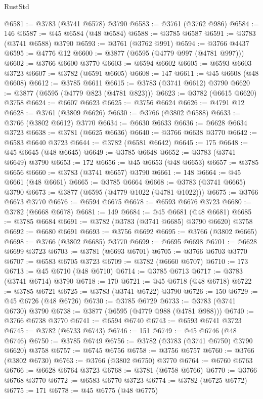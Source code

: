 \begin{lexlean}{RustStd}
\begin{coremodule}
@6581 := @3783 (@3741 @6578) @3790
@6583 := @3761 (@3762 @986)
@6584 := 146
@6587 := @45 @6584 (@48 @6584)
@6588 := @3785 @6587
@6591 := @3783 (@3741 @6588) @3790
@6593 := @3761 (@3762 @991)
@6594 := @3766 @4437
@6595 := @4776 @12
@6600 := @3877 (@6595 (@4779 @997 (@4781 @997)))
@6602 := @3766 @6600 @3770
@6603 := @6594 @6602
@6605 := @6593 @6603 @3723
@6607 := @3782 (@6591 @6605)
@6608 := 147
@6611 := @45 @6608 (@48 @6608)
@6612 := @3785 @6611
@6615 := @3783 (@3741 @6612) @3790
@6620 := @3877 (@6595 (@4779 @823 (@4781 @823)))
@6623 := @3782 (@6615 @6620) @3758
@6624 := @6607 @6623
@6625 := @3756 @6624
@6626 := @4791 @12
@6628 := @3761 (@3809 @6626)
@6630 := @3766 (@3802 @6588)
@6633 := @3766 (@3802 @6612) @3770
@6634 := @6630 @6633
@6636 := @6628 @6634 @3723
@6638 := @3781 (@6625 @6636)
@6640 := @3766 @6638 @3770
@6642 := @6583 @6640 @3723
@6644 := @3782 (@6581 @6642)
@6645 := 175
@6648 := @45 @6645 (@48 @6645)
@6649 := @3785 @6648
@6652 := @3783 (@3741 @6649) @3790
@6653 := 172
@6656 := @45 @6653 (@48 @6653)
@6657 := @3785 @6656
@6660 := @3783 (@3741 @6657) @3790
@6661 := 148
@6664 := @45 @6661 (@48 @6661)
@6665 := @3785 @6664
@6668 := @3783 (@3741 @6665) @3790
@6673 := @3877 (@6595 (@4779 @1022 (@4781 @1022)))
@6675 := @3766 @6673 @3770
@6676 := @6594 @6675
@6678 := @6593 @6676 @3723
@6680 := @3782 (@6668 @6678)
@6681 := 149
@6684 := @45 @6681 (@48 @6681)
@6685 := @3785 @6684
@6691 := @3782 (@3783 (@3741 @6685) @3790 @6620) @3758
@6692 := @6680 @6691
@6693 := @3756 @6692
@6695 := @3766 (@3802 @6665)
@6698 := @3766 (@3802 @6685) @3770
@6699 := @6695 @6698
@6701 := @6628 @6699 @3723
@6703 := @3781 (@6693 @6701)
@6705 := @3766 @6703 @3770
@6707 := @6583 @6705 @3723
@6709 := @3782 (@6660 @6707)
@6710 := 173
@6713 := @45 @6710 (@48 @6710)
@6714 := @3785 @6713
@6717 := @3783 (@3741 @6714) @3790
@6718 := 170
@6721 := @45 @6718 (@48 @6718)
@6722 := @3785 @6721
@6725 := @3783 (@3741 @6722) @3790
@6726 := 150
@6729 := @45 @6726 (@48 @6726)
@6730 := @3785 @6729
@6733 := @3783 (@3741 @6730) @3790
@6738 := @3877 (@6595 (@4779 @988 (@4781 @988)))
@6740 := @3766 @6738 @3770
@6741 := @6594 @6740
@6743 := @6593 @6741 @3723
@6745 := @3782 (@6733 @6743)
@6746 := 151
@6749 := @45 @6746 (@48 @6746)
@6750 := @3785 @6749
@6756 := @3782 (@3783 (@3741 @6750) @3790 @6620) @3758
@6757 := @6745 @6756
@6758 := @3756 @6757
@6760 := @3766 (@3802 @6730)
@6763 := @3766 (@3802 @6750) @3770
@6764 := @6760 @6763
@6766 := @6628 @6764 @3723
@6768 := @3781 (@6758 @6766)
@6770 := @3766 @6768 @3770
@6772 := @6583 @6770 @3723
@6774 := @3782 (@6725 @6772)
@6775 := 171
@6778 := @45 @6775 (@48 @6775)

\end{coremodule}
\end{lexlean}
